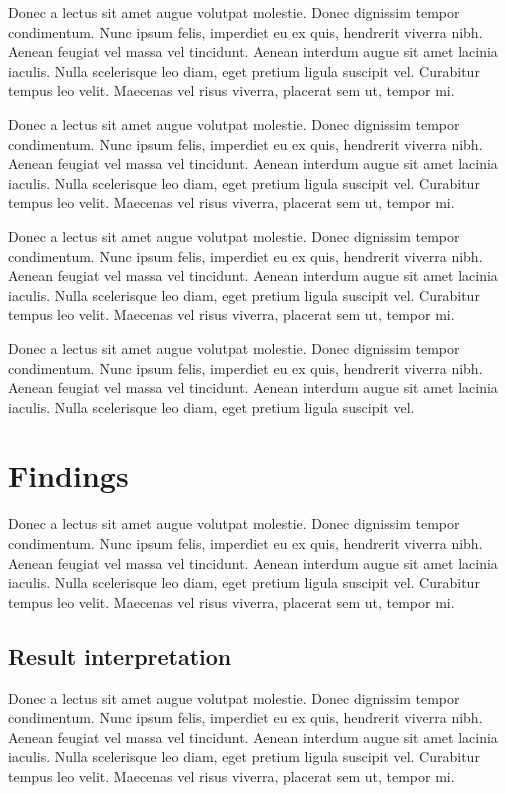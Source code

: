 \documentclass{article}
\begin{document}
\vspace{5mm}
Donec a lectus sit amet augue volutpat molestie. Donec dignissim tempor condimentum. Nunc ipsum felis, imperdiet
eu ex quis, hendrerit viverra nibh. Aenean feugiat vel massa vel tincidunt. Aenean interdum augue sit amet lacinia
iaculis. Nulla scelerisque leo diam, eget pretium ligula suscipit vel. Curabitur tempus leo velit. Maecenas vel
risus viverra, placerat sem ut, tempor mi.

\vspace{5mm}
Donec a lectus sit amet augue volutpat molestie. Donec dignissim tempor condimentum. Nunc ipsum felis, imperdiet
eu ex quis, hendrerit viverra nibh. Aenean feugiat vel massa vel tincidunt. Aenean interdum augue sit amet lacinia
iaculis. Nulla scelerisque leo diam, eget pretium ligula suscipit vel. Curabitur tempus leo velit. Maecenas vel
risus viverra, placerat sem ut, tempor mi.

\vspace{5mm}
Donec a lectus sit amet augue volutpat molestie. Donec dignissim tempor condimentum. Nunc ipsum felis, imperdiet
eu ex quis, hendrerit viverra nibh. Aenean feugiat vel massa vel tincidunt. Aenean interdum augue sit amet lacinia
iaculis. Nulla scelerisque leo diam, eget pretium ligula suscipit vel. Curabitur tempus leo velit. Maecenas vel
risus viverra, placerat sem ut, tempor mi.

\vspace{5mm}
Donec a lectus sit amet augue volutpat molestie. Donec dignissim tempor condimentum. Nunc ipsum felis, imperdiet
eu ex quis, hendrerit viverra nibh. Aenean feugiat vel massa vel tincidunt. Aenean interdum augue sit amet lacinia
iaculis. Nulla scelerisque leo diam, eget pretium ligula suscipit vel.

\section{Findings}
Donec a lectus sit amet augue volutpat molestie. Donec dignissim tempor condimentum. Nunc ipsum felis, imperdiet
eu ex quis, hendrerit viverra nibh. Aenean feugiat vel massa vel tincidunt. Aenean interdum augue sit amet lacinia
iaculis. Nulla scelerisque leo diam, eget pretium ligula suscipit vel. Curabitur tempus leo velit. Maecenas vel
risus viverra, placerat sem ut, tempor mi.

\subsection{Result interpretation}
Donec a lectus sit amet augue volutpat molestie. Donec dignissim tempor condimentum. Nunc ipsum felis, imperdiet
eu ex quis, hendrerit viverra nibh. Aenean feugiat vel massa vel tincidunt. Aenean interdum augue sit amet lacinia
iaculis. Nulla scelerisque leo diam, eget pretium ligula suscipit vel. Curabitur tempus leo velit. Maecenas vel
risus viverra, placerat sem ut, tempor mi.
\end{document}
